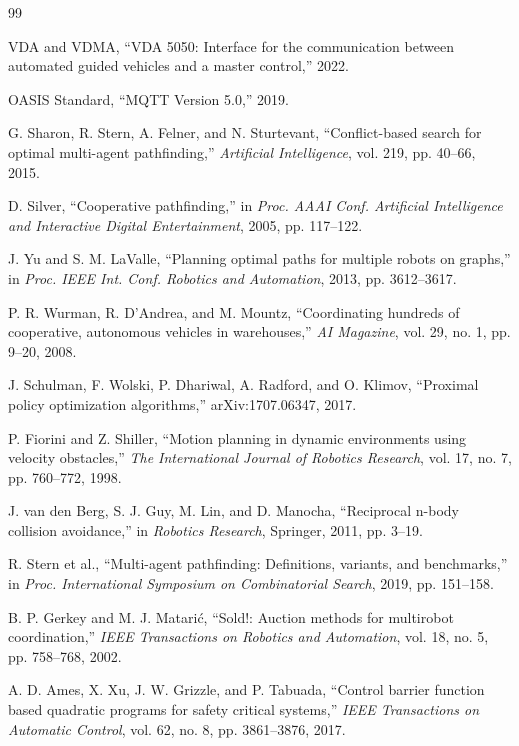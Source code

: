 \documentclass[UTF8,twocolumn,11pt]{ctexart}
\begin{document}
\begin{thebibliography}{99}

VDA and VDMA, ``VDA 5050: Interface for the communication between automated guided vehicles and a master control,'' 2022.

OASIS Standard, ``MQTT Version 5.0,'' 2019.

G. Sharon, R. Stern, A. Felner, and N. Sturtevant, ``Conflict-based search for optimal multi-agent pathfinding,'' \emph{Artificial Intelligence}, vol. 219, pp. 40--66, 2015.

D. Silver, ``Cooperative pathfinding,'' in \emph{Proc. AAAI Conf. Artificial Intelligence and Interactive Digital Entertainment}, 2005, pp. 117--122.

J. Yu and S. M. LaValle, ``Planning optimal paths for multiple robots on graphs,'' in \emph{Proc. IEEE Int. Conf. Robotics and Automation}, 2013, pp. 3612--3617.

P. R. Wurman, R. D'Andrea, and M. Mountz, ``Coordinating hundreds of cooperative, autonomous vehicles in warehouses,'' \emph{AI Magazine}, vol. 29, no. 1, pp. 9--20, 2008.

J. Schulman, F. Wolski, P. Dhariwal, A. Radford, and O. Klimov, ``Proximal policy optimization algorithms,'' arXiv:1707.06347, 2017.

P. Fiorini and Z. Shiller, ``Motion planning in dynamic environments using velocity obstacles,'' \emph{The International Journal of Robotics Research}, vol. 17, no. 7, pp. 760--772, 1998.

J. van den Berg, S. J. Guy, M. Lin, and D. Manocha, ``Reciprocal n-body collision avoidance,'' in \emph{Robotics Research}, Springer, 2011, pp. 3--19.

R. Stern et al., ``Multi-agent pathfinding: Definitions, variants, and benchmarks,'' in \emph{Proc. International Symposium on Combinatorial Search}, 2019, pp. 151--158.

B. P. Gerkey and M. J. Matarić, ``Sold!: Auction methods for multirobot coordination,'' \emph{IEEE Transactions on Robotics and Automation}, vol. 18, no. 5, pp. 758--768, 2002.

A. D. Ames, X. Xu, J. W. Grizzle, and P. Tabuada, ``Control barrier function based quadratic programs for safety critical systems,'' \emph{IEEE Transactions on Automatic Control}, vol. 62, no. 8, pp. 3861--3876, 2017.

\end{thebibliography}
\end{document}
